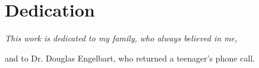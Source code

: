 
\chapter{Dedication}
{
\it
This work is dedicated to my family, who always believed in me,

and to Dr. Douglas Engelbart, who returned a teenager's phone call.
}
